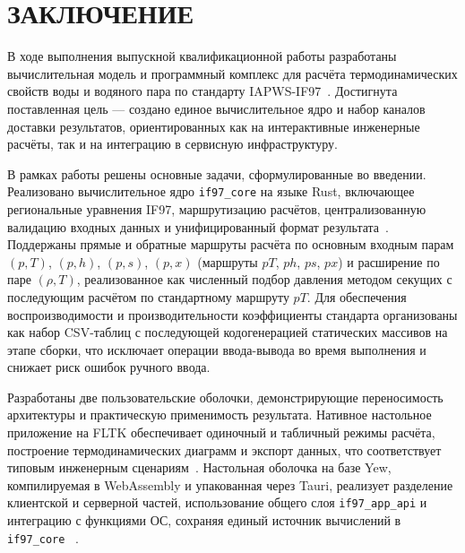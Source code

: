\clearpage
\chapter*{ЗАКЛЮЧЕНИЕ}

В ходе выполнения выпускной квалификационной работы разработаны вычислительная модель и программный комплекс для расчёта термодинамических свойств воды и водяного пара по стандарту IAPWS-IF97~\cite{iapws_if97_2012}.
Достигнута поставленная цель --- создано единое вычислительное ядро и набор каналов доставки результатов,
ориентированных как на интерактивные инженерные расчёты,
так и на интеграцию в сервисную инфраструктуру.

В рамках работы решены основные задачи, сформулированные во введении.
Реализовано вычислительное ядро \texttt{if97\_core} на языке Rust,
включающее региональные уравнения IF97,
маршрутизацию расчётов,
централизованную валидацию входных данных
и унифицированный формат результата~\cite{rust_book}.
Поддержаны прямые и обратные маршруты расчёта по основным входным парам $(p, T)$, $(p, h)$, $(p, s)$, $(p, x)$ (маршруты $pT$, $ph$, $ps$, $px$)
и расширение по паре $(\rho, T)$,
реализованное как численный подбор давления методом секущих
с последующим расчётом по стандартному маршруту $pT$.
Для обеспечения воспроизводимости и производительности коэффициенты стандарта организованы
как набор CSV-таблиц с последующей кодогенерацией статических массивов на этапе сборки,
что исключает операции ввода-вывода во время выполнения
и снижает риск ошибок ручного ввода.

Разработаны две пользовательские оболочки,
демонстрирующие переносимость архитектуры и практическую применимость результата.
Нативное настольное приложение на FLTK обеспечивает одиночный и табличный режимы расчёта,
построение термодинамических диаграмм и экспорт данных,
что соответствует типовым инженерным сценариям~\cite{fltk_rs_docs}.
Настольная оболочка на базе Yew,
компилируемая в WebAssembly и упакованная через Tauri,
реализует разделение клиентской и серверной частей,
использование общего слоя \texttt{if97\_app\_api}
и интеграцию с функциями ОС,
сохраняя единый источник вычислений в \texttt{if97\_core}
~\cite{yew_docs,webassembly_docs,tauri_docs}.  

